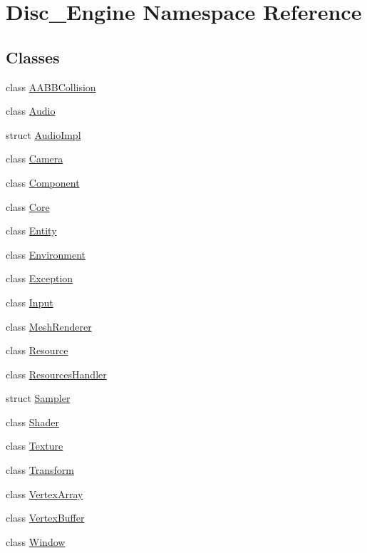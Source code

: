 \hypertarget{namespace_disc___engine}{}\section{Disc\+\_\+\+Engine Namespace Reference}
\label{namespace_disc___engine}
\subsection*{Classes}
\begin{DoxyCompactItemize}
\item 
class \mbox{\hyperlink{class_disc___engine_1_1_a_a_b_b_collision}{A\+A\+B\+B\+Collision}}
\item 
class \mbox{\hyperlink{class_disc___engine_1_1_audio}{Audio}}
\item 
struct \mbox{\hyperlink{struct_disc___engine_1_1_audio_impl}{Audio\+Impl}}
\item 
class \mbox{\hyperlink{class_disc___engine_1_1_camera}{Camera}}
\item 
class \mbox{\hyperlink{class_disc___engine_1_1_component}{Component}}
\item 
class \mbox{\hyperlink{class_disc___engine_1_1_core}{Core}}
\item 
class \mbox{\hyperlink{class_disc___engine_1_1_entity}{Entity}}
\item 
class \mbox{\hyperlink{class_disc___engine_1_1_environment}{Environment}}
\item 
class \mbox{\hyperlink{class_disc___engine_1_1_exception}{Exception}}
\item 
class \mbox{\hyperlink{class_disc___engine_1_1_input}{Input}}
\item 
class \mbox{\hyperlink{class_disc___engine_1_1_mesh_renderer}{Mesh\+Renderer}}
\item 
class \mbox{\hyperlink{class_disc___engine_1_1_resource}{Resource}}
\item 
class \mbox{\hyperlink{class_disc___engine_1_1_resources_handler}{Resources\+Handler}}
\item 
struct \mbox{\hyperlink{struct_disc___engine_1_1_sampler}{Sampler}}
\item 
class \mbox{\hyperlink{class_disc___engine_1_1_shader}{Shader}}
\item 
class \mbox{\hyperlink{class_disc___engine_1_1_texture}{Texture}}
\item 
class \mbox{\hyperlink{class_disc___engine_1_1_transform}{Transform}}
\item 
class \mbox{\hyperlink{class_disc___engine_1_1_vertex_array}{Vertex\+Array}}
\item 
class \mbox{\hyperlink{class_disc___engine_1_1_vertex_buffer}{Vertex\+Buffer}}
\item 
class \mbox{\hyperlink{class_disc___engine_1_1_window}{Window}}
\end{DoxyCompactItemize}
